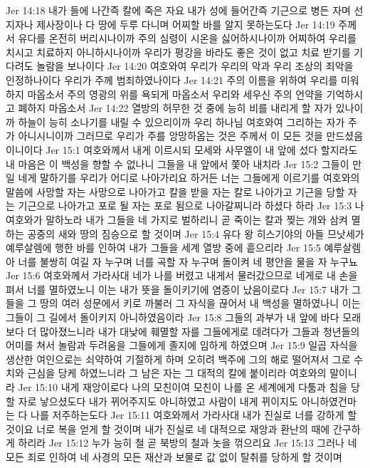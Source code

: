 Jer 14:18  내가 들에 나간즉 칼에 죽은 자요 내가 성에 들어간즉 기근으로 병든 자며 선지자나 제사장이나 다 땅에 두루 다니며 어찌할 바를 알지 못하는도다
Jer 14:19  주께서 유다를 온전히 버리시나이까 주의 심령이 시온을 싫어하시나이까 어찌하여 우리를 치시고 치료하지 아니하시나이까 우리가 평강을 바라도 좋은 것이 없고 치료 받기를 기다려도 놀람을 보나이다
Jer 14:20  여호와여 우리가 우리의 악과 우리 조상의 죄악을 인정하나이다 우리가 주께 범죄하였나이다
Jer 14:21  주의 이름을 위하여 우리를 미워하지 마옵소서 주의 영광의 위를 욕되게 마옵소서 우리와 세우신 주의 언약을 기억하시고 폐하지 마옵소서
Jer 14:22  열방의 허무한 것 중에 능히 비를 내리게 할 자가 있나이까 하늘이 능히 소나기를 내릴 수 있으리이까 우리 하나님 여호와여 그리하는 자가 주가 아니시니이까 그러므로 우리가 주를 앙망하옵는 것은 주께서 이 모든 것을 만드셨음이니이다
Jer 15:1  여호와께서 내게 이르시되 모세와 사무엘이 내 앞에 섰다 할지라도 내 마음은 이 백성을 향할 수 없나니 그들을 내 앞에서 쫓아 내치라
Jer 15:2  그들이 만일 네게 말하기를 우리가 어디로 나아가리요 하거든 너는 그들에게 이르기를 여호와의 말씀에 사망할 자는 사망으로 나아가고 칼을 받을 자는 칼로 나아가고 기근을 당할 자는 기근으로 나아가고 포로 될 자는 포로 됨으로 나아갈찌니라 하셨다 하라
Jer 15:3  나 여호와가 말하노라 내가 그들을 네 가지로 벌하리니 곧 죽이는 칼과 찢는 개와 삼켜 멸하는 공중의 새와 땅의 짐승으로 할 것이며
Jer 15:4  유다 왕 히스기야의 아들 므낫세가 예루살렘에 행한 바를 인하여 내가 그들을 세계 열방 중에 흩으리라
Jer 15:5  예루살렘아 너를 불쌍히 여길 자 누구며 너를 곡할 자 누구며 돌이켜 네 평안을 물을 자 누구뇨
Jer 15:6  여호와께서 가라사대 네가 나를 버렸고 내게서 물러갔으므로 네게로 내 손을 펴서 너를 멸하였노니 이는 내가 뜻을 돌이키기에 염증이 났음이로다
Jer 15:7  내가 그들을 그 땅의 여러 성문에서 키로 까불러 그 자식을 끊어서 내 백성을 멸하였나니 이는 그들이 그 길에서 돌이키지 아니하였음이라
Jer 15:8  그들의 과부가 내 앞에 바다 모래보다 더 많아졌느니라 내가 대낮에 훼멸할 자를 그들에게로 데려다가 그들과 청년들의 어미를 쳐서 놀람과 두려움을 그들에게 졸지에 임하게 하였으며
Jer 15:9  일곱 자식을 생산한 여인으로는 쇠약하여 기절하게 하며 오히려 백주에 그의 해로 떨어져서 그로 수치와 근심을 당케 하였느니라 그 남은 자는 그 대적의 칼에 붙이리라 여호와의 말이니라
Jer 15:10  내게 재앙이로다 나의 모친이여 모친이 나를 온 세계에게 다툼과 침을 당할 자로 낳으셨도다 내가 뀌어주지도 아니하였고 사람이 내게 뀌이지도 아니하였건마는 다 나를 저주하는도다
Jer 15:11  여호와께서 가라사대 내가 진실로 너를 강하게 할 것이요 너로 복을 얻게 할 것이며 내가 진실로 네 대적으로 재앙과 환난의 때에 간구하게 하리라
Jer 15:12  누가 능히 철 곧 북방의 철과 놋을 꺾으리요
Jer 15:13  그러나 네 모든 죄로 인하여 네 사경의 모든 재산과 보물로 값 없이 탈취를 당하게 할 것이며
